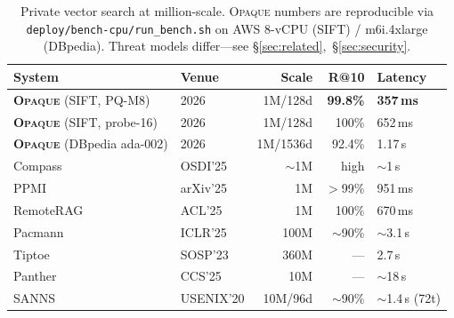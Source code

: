 \documentclass[11pt]{article}
\newcommand{\opaque}{\textsc{Opaque}}
\begin{document}
\begin{table}[t]
  \centering
  \footnotesize
  \setlength{\tabcolsep}{4pt}
  \begin{tabular}{@{}llrrl@{}}
    \toprule
    System & Venue & Scale & R@10 & Latency \\
    \midrule
    \textbf{\opaque{}} (SIFT, PQ-M8) & 2026 & 1M/128d & \textbf{99.8\%} & \textbf{357\,ms} \\
    \textbf{\opaque{}} (SIFT, probe-16) & 2026 & 1M/128d & 100\% & 652\,ms \\
    \textbf{\opaque{}} (DBpedia ada-002) & 2026 & 1M/1536d & 92.4\% & 1.17\,s \\
    Compass & OSDI'25 & $\sim$1M & high & $\sim$1\,s \\
    PPMI & arXiv'25 & 1M & $>$99\% & 951\,ms \\
    RemoteRAG & ACL'25 & 1M & 100\% & 670\,ms \\
    Pacmann & ICLR'25 & 100M & $\sim$90\% & $\sim$3.1\,s \\
    Tiptoe & SOSP'23 & 360M & --- & 2.7\,s \\
    Panther & CCS'25 & 10M & --- & $\sim$18\,s \\
    SANNS & USENIX'20 & 10M/96d & $\sim$90\% & $\sim$1.4\,s (72t) \\
    \bottomrule
  \end{tabular}
  \caption{Private vector search at million-scale. \opaque{} numbers are reproducible
    via \texttt{deploy/bench-cpu/run\_bench.sh} on AWS 8-vCPU (SIFT) / m6i.4xlarge
    (DBpedia). Threat models differ---see \S\ref{sec:related},~\S\ref{sec:security}.}
  \label{tab:compare}
\end{table}
\end{document}

